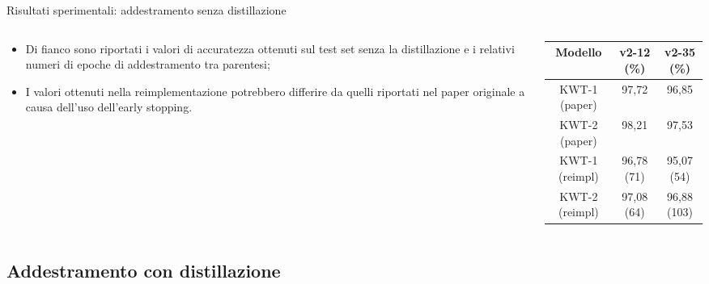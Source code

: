 \documentclass[aspectratio=169]{beamer}
\begin{document}
\begin{frame}{Risultati sperimentali: addestramento senza distillazione}
  \begin{columns}[c]
    \begin{column}{0.4\textwidth}
      \begin{itemize}
        \item Di fianco sono riportati i valori di accuratezza ottenuti sul test set senza la distillazione e i relativi numeri di epoche di addestramento tra parentesi;
        \item I valori ottenuti nella reimplementazione potrebbero differire da quelli riportati nel paper originale a causa dell'uso dell'early stopping.
      \end{itemize}
    \end{column}
    \begin{column}{0.6\textwidth}
      \centering
      \begin{tabular}{ccc}
        \toprule
        \textbf{Modello} & \textbf{v2-12 (\%)} & \textbf{v2-35 (\%)} \\
        \midrule
        KWT-1 (paper) & 97,72 & 96,85 \\
        KWT-2 (paper) & 98,21 & 97,53 \\
        \midrule
        KWT-1 (reimpl) & 96,78 (71) & 95,07 (54) \\
        KWT-2 (reimpl) & 97,08 (64) & 96,88 (103) \\
        \bottomrule
      \end{tabular}
    \end{column}
  \end{columns}
\end{frame}

\subsection{Addestramento con distillazione}
\end{document}
